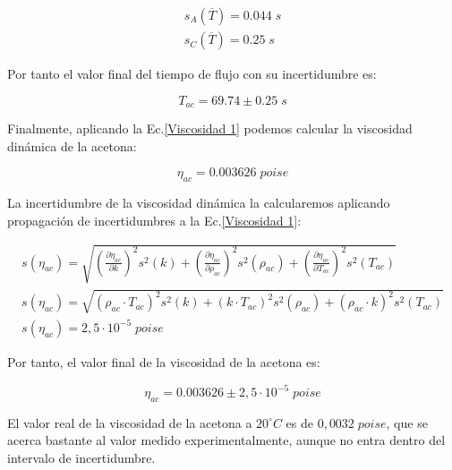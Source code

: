 \documentclass[a4paper,12pt,titlepage]{article}
\begin{document}
\begin{equation}
    \begin{gathered}
        s_A(\overline{T}) = 0.044 \; s \\
        s_C(\overline{T}) = 0.25 \; s
    \end{gathered}
\end{equation}

Por tanto el valor final del tiempo de flujo con su incertidumbre es:

\begin{equation}
    T_{ac} = 69.74 \pm 0.25 \; s
\end{equation}

Finalmente, aplicando la Ec.\ref{Viscosidad 1} podemos calcular la viscosidad dinámica de la acetona:

\begin{equation}
    \eta_{ac} = 0.003626 \; poise
\end{equation}

La incertidumbre de la viscosidad dinámica la calcularemos aplicando propagación de incertidumbres a la Ec.\ref{Viscosidad 1}:

\begin{equation}
    \begin{gathered}
    s\left(\eta_{ac}\right) =\sqrt{\left(\frac{\partial \eta_{ac}}{\partial k}\right)^2 s^2(k)+\left(\frac{\partial \eta_{a c}}{\partial \rho_{a c}}\right)^2 s^2\left(\rho_{ac}\right)+\left(\frac{\partial \eta_{ac}}{\partial T_{ac}}\right)^2 s^2\left(T_{a c}\right)} \\
    s\left(\eta_{a c}\right)  =\sqrt{\left(\rho_{a c} \cdot T_{a c}\right)^2 s^2(k)+\left(k \cdot T_{a c}\right)^2 s^2\left(\rho_{a c}\right)+\left(\rho_{a c} \cdot k\right)^2 s^2\left(T_{a c}\right)} \\
    s(\eta_{ac}) = 2,5 \cdot 10^{-5} \; poise
    \end{gathered}
    \label{Inc visc}
\end{equation}

Por tanto, el valor final de la viscosidad de la acetona es:

\begin{equation}
    \eta_{ac} = 0.003626 \pm 2,5 \cdot 10^{-5} \; poise
\end{equation}

El valor real de la viscosidad de la acetona a $20^{\circ} C$ es de $0,0032 \; poise$, que se acerca bastante al valor medido experimentalmente, aunque no entra dentro del intervalo de incertidumbre.
\end{document}
